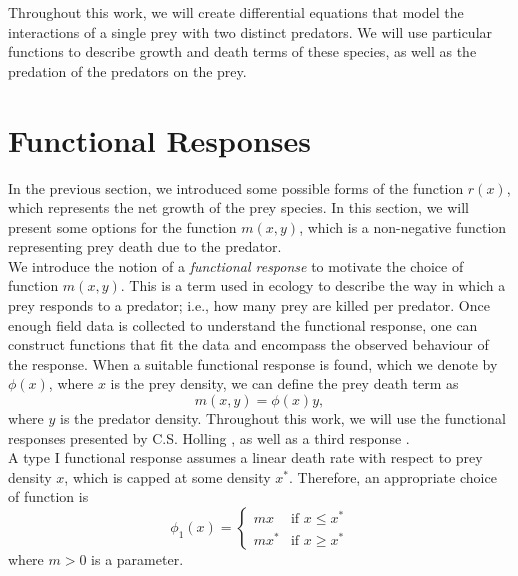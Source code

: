 \documentclass[12pt]{UOthesis}
\theoremstyle{remarkstyle}
\begin{document}
Throughout this work, we will create differential equations that model the interactions of a single prey with two distinct predators. We will use particular functions to describe growth and death terms of these species, as well as the predation of the predators on the prey.


\section{Functional Responses}
\label{SectionFunRes}

In the previous section, we introduced some possible forms of the function $r(x)$, which represents the net growth of the prey species. In this section, we will present some options for the function $m(x,y)$, which is a non-negative function representing prey death due to the predator.\\

We introduce the notion of a \textit{functional response} to motivate the choice of function $m(x,y)$. This is a term used in ecology to describe the way in which a prey responds to a predator; i.e., how many prey are killed per predator. Once enough field data is collected to understand the functional response, one can construct functions that fit the data and encompass the observed behaviour of the response. When a suitable functional response is found, which we denote by $\phi(x)$, where $x$ is the prey density, we can define the prey death term as
$$m(x,y)=\phi(x)y,$$
where $y$ is the predator density. Throughout this work, we will use the functional responses presented by C.S. Holling \cite{Holling1,Holling2}, as well as a third response \cite{Real}.\\

A type I functional response assumes a linear death rate with respect to prey density $x$, which is capped at some density $x^*$. Therefore, an appropriate choice of function is
\begin{equation}
	\phi_1(x)=\begin{cases}
		mx&\text{if }x\le x^*\\
		mx^*&\text{if }x\ge x^*
	\end{cases}
	\label{TypeIFR}
\end{equation}
where $m>0$ is a parameter.\\
\end{document}
